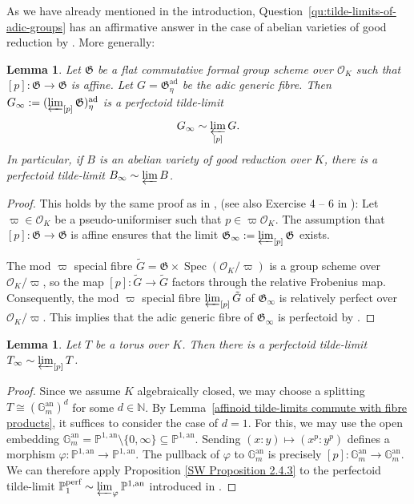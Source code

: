\documentclass[10pt,oneside]{amsart}
\newtheorem{lemma}[theorem]{Lemma}
\theoremstyle{definition}
\newcommand{\Spec}{\operatorname{Spec}}
\newcommand{\an}{\mathrm{an}}
\newcommand{\ad}{\mathrm{ad}}
\renewcommand{\O}{\mathcal{O}}
\newcommand{\N}{\mathbb{N}}
\begin{document}
As we have already mentioned in the introduction, Question~\ref{qu:tilde-limits-of-adic-groups} has an affirmative answer in the case of abelian varieties of good reduction by \cite[Lemme~A.16]{Pilloni-Stroh}. More generally:
\begin{lemma}\label{tilde-limit exists and is perfectoid in the good reduction case}
		Let $\mathfrak G$ be a flat commutative formal group scheme over $\O_K$ such that $[p]:\mathfrak G\to\mathfrak G$ is affine. Let $G=\mathfrak G^{\ad}_{\eta}$ be the adic generic fibre. Then $G_\infty := (\varprojlim_{[p]}\mathfrak G)^{\ad}_\eta$ is a perfectoid tilde-limit
		\[G_\infty\sim \varprojlim_{[p]} G. \]
		In particular, if $B$ is an abelian variety of good reduction over $K$, there is a perfectoid tilde-limit $B_\infty\sim \varprojlim B$.
	\end{lemma}
\begin{proof}
	This holds by the same proof as in \cite[Lemme~A.16]{Pilloni-Stroh}, (see also Exercise 4 -- 6 in \cite{Bhatt}):
	 Let $\varpi\in\mathcal O_K$ be a pseudo-uniformiser such that $p\in \varpi\mathcal O_K$. The assumption that $[p]:\mathfrak G\to \mathfrak G$ is affine ensures that the limit $\mathfrak G_{\infty}:=\varprojlim_{[p]}\mathfrak G$ exists.
	 
	The mod $\varpi$ special fibre $\tilde{G} = \mathfrak G\times \Spec(\O_K/\varpi)$ is a group scheme over $\mathcal O_K/\varpi$, so the map $[p]\colon\tilde{G}\rightarrow \tilde{G}$ factors through the relative Frobenius map. Consequently, the mod $\varpi$ special fibre $\varprojlim_{[p]}\tilde{G}$ of $\mathfrak G_{\infty}$ is relatively perfect over $\mathcal O_K/\varpi$. This implies that the adic generic fibre of $\mathfrak G_{\infty}$ is perfectoid by \cite[Theorem~5.2]{perfectoid}.
\end{proof}
\begin{lemma}
	Let $T$ be a torus over $K$. Then there is a perfectoid tilde-limit $T_\infty\sim \varprojlim_{[p]} T$.
\end{lemma}
\begin{proof}
Since we assume $K$ algebraically closed, we may choose a splitting $T\cong (\mathbb{G}_m^{\an})^d$ for some $d\in \N$. By Lemma~\ref{affinoid tilde-limits commute with fibre products}, it suffices to consider the case of $d=1$. For this, we may use the open embedding $\mathbb G_m^{\an}= \mathbb P^{1,\an}\setminus\{0, \infty\}\subseteq \mathbb P^{1,\an}$. Sending $(x:y)\mapsto (x^p:y^p)$ defines a morphism $\varphi:\mathbb P^{1,\an}\to \mathbb P^{1,\an}$. The pullback of $\varphi$ to $\mathbb G_m^{\an}$ is precisely $[p]:\mathbb G_m^{\an}\to \mathbb G_m^{\an}$. We can therefore apply Proposition \ref{SW Proposition 2.4.3} to the perfectoid tilde-limit $\mathbb P_1^{\text{perf}}\sim \varprojlim_{\varphi} \mathbb P^{1,\an}$ introduced in \cite{perfectoid}. 
\end{proof}
\end{document}
